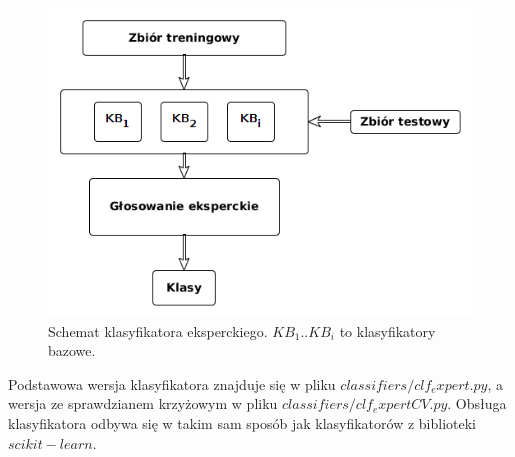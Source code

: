 \begin{figure}[h]
	\centering
	\includegraphics[width=\textwidth]{./images/klas_ekspercki.png}
	\caption{Schemat klasyfikatora eksperckiego. $KB_1..KB_i$ to klasyfikatory bazowe.}
	\label{fig:klasyfikator_ekspercki}
\end{figure}
Podstawowa wersja klasyfikatora znajduje się w pliku $classifiers/clf_expert.py$, a wersja ze sprawdzianem krzyżowym w pliku $classifiers/clf_expertCV.py$. Obsługa klasyfikatora odbywa się w takim sam sposób jak klasyfikatorów z biblioteki $scikit-learn$.
